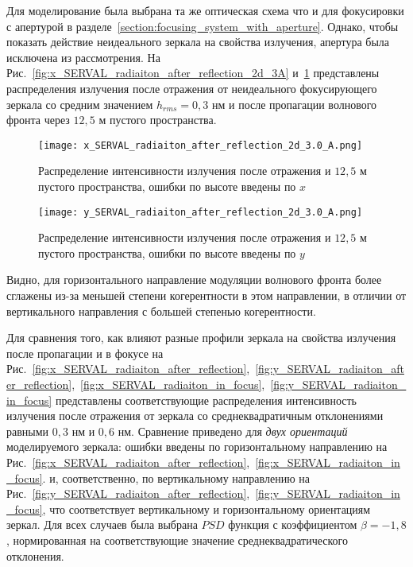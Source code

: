 Для моделирование была выбрана та же оптическая схема что и для фокусировки с апертурой в разделе~\ref{section:focusing_system_with_aperture}. Однако, чтобы показать действие неидеального зеркала на свойства излучения, апертура была исключена из рассмотрения. На Рис.~\ref{fig:x_SERVAL_radiaiton_after_reflection_2d_3A} и~\ref{fig:y_SERVAL_radiaiton_after_reflection_2d_3A} представлены распределения излучения после отражения от неидеального фокусирующего зеркала со средним значением $h_{rms} = 0,3$ нм и после пропагации волнового фронта через $12,5$ м пустого пространства.
\begin{figure}[H]
	\centering
	\begin{minipage}{0.49\textwidth}
		\centering
		\texttt{[image: x\_SERVAL\_radiaiton\_after\_reflection\_2d\_3.0\_A.png]}
		\caption{Распределение интенсивности излучения после отражения и $12,5$ м пустого пространства, ошибки по высоте введены по $x$}
		\label{fig:x_SERVAL_radiaiton_after_reflection_2d_3A}
	\end{minipage}
	\begin{minipage}{0.49\textwidth}
		\centering
		\texttt{[image: y\_SERVAL\_radiaiton\_after\_reflection\_2d\_3.0\_A.png]}
		\caption{Распределение интенсивности излучения после отражения и $12,5$ м пустого пространства, ошибки по высоте введены по $y$}
		\label{fig:y_SERVAL_radiaiton_after_reflection_2d_3A}
	\end{minipage}\hfill
\end{figure}
\noindent Видно, для горизонтального направление модуляции волнового фронта более сглажены из-за меньшей степени когерентности в этом направлении, в отличии от вертикального направления с большей степенью когерентности.

Для сравнения того, как влияют разные профили зеркала на свойства излучения после пропагации и в фокусе на Рис.~\ref{fig:x_SERVAL_radiaiton_after_reflection},~\ref{fig:y_SERVAL_radiaiton_after_reflection},~\ref{fig:x_SERVAL_radiaiton_in_focus},~\ref{fig:y_SERVAL_radiaiton_in_focus} представлены соответствующие распределения интенсивность излучения после отражения от зеркала со среднеквадратичным отклонениями равными $0,3$ нм и $0,6$ нм. Сравнение приведено для \textit{двух ориентаций} моделируемого зеркала: ошибки введены по горизонтальному направлению  на Рис.~\ref{fig:x_SERVAL_radiaiton_after_reflection},~\ref{fig:x_SERVAL_radiaiton_in_focus}. и, соответственно, по вертикальному направлению на Рис.~\ref{fig:y_SERVAL_radiaiton_after_reflection},~\ref{fig:y_SERVAL_radiaiton_in_focus}, что соответствует вертикальному и горизонтальному ориентациям зеркал. Для всех случаев была выбрана $PSD$ функция с коэффициентом $\beta = -1,8$, нормированная на соответствующие значение среднеквадратического отклонения.

